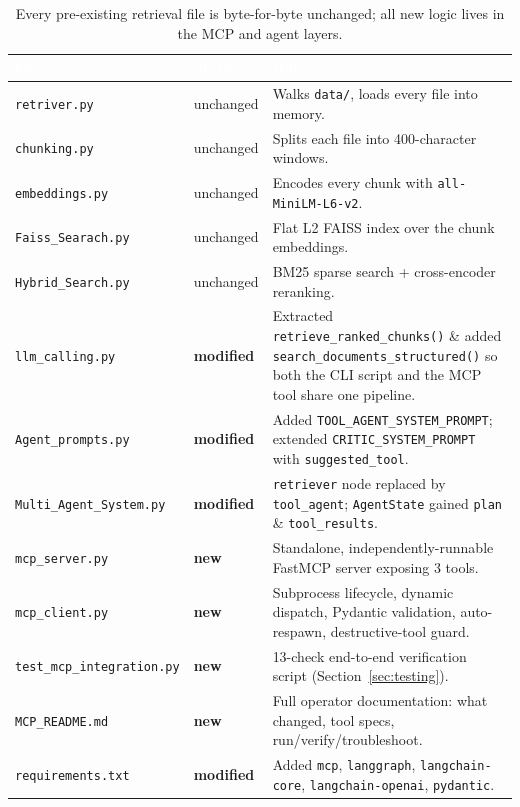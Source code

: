 \documentclass[11pt,a4paper]{article}
\begin{document}
\begin{table}[H]
\centering
\small
\begin{tabularx}{\textwidth}{@{}l l X@{}}
\toprule
\rowcolor{navylight}
\textcolor{white}{\textbf{File}} & \textcolor{white}{\textbf{Status}} & \textcolor{white}{\textbf{Role}} \\
\midrule
\texttt{retriver.py} & unchanged & Walks \texttt{data/}, loads every file into memory. \\
\texttt{chunking.py} & unchanged & Splits each file into 400-character windows. \\
\texttt{embeddings.py} & unchanged & Encodes every chunk with \texttt{all-MiniLM-L6-v2}. \\
\texttt{Faiss\_Searach.py} & unchanged & Flat L2 FAISS index over the chunk embeddings. \\
\texttt{Hybrid\_Search.py} & unchanged & BM25 sparse search + cross-encoder reranking. \\
\texttt{llm\_calling.py} & \textbf{modified} & Extracted \texttt{retrieve\_ranked\_chunks()} \& added \texttt{search\_documents\_structured()} so both the CLI script and the MCP tool share one pipeline. \\
\texttt{Agent\_prompts.py} & \textbf{modified} & Added \texttt{TOOL\_AGENT\_SYSTEM\_PROMPT}; extended \texttt{CRITIC\_SYSTEM\_PROMPT} with \texttt{suggested\_tool}. \\
\texttt{Multi\_Agent\_System.py} & \textbf{modified} & \texttt{retriever} node replaced by \texttt{tool\_agent}; \texttt{AgentState} gained \texttt{plan} \& \texttt{tool\_results}. \\
\texttt{mcp\_server.py} & \textbf{new} & Standalone, independently-runnable FastMCP server exposing 3 tools. \\
\texttt{mcp\_client.py} & \textbf{new} & Subprocess lifecycle, dynamic dispatch, Pydantic validation, auto-respawn, destructive-tool guard. \\
\texttt{test\_mcp\_integration.py} & \textbf{new} & 13-check end-to-end verification script (Section~\ref{sec:testing}). \\
\texttt{MCP\_README.md} & \textbf{new} & Full operator documentation: what changed, tool specs, run/verify/troubleshoot. \\
\texttt{requirements.txt} & \textbf{modified} & Added \texttt{mcp}, \texttt{langgraph}, \texttt{langchain-core}, \texttt{langchain-openai}, \texttt{pydantic}. \\
\bottomrule
\end{tabularx}
\caption{Every pre-existing retrieval file is byte-for-byte unchanged; all new logic lives in the MCP and agent layers.}
\end{table}
\end{document}
